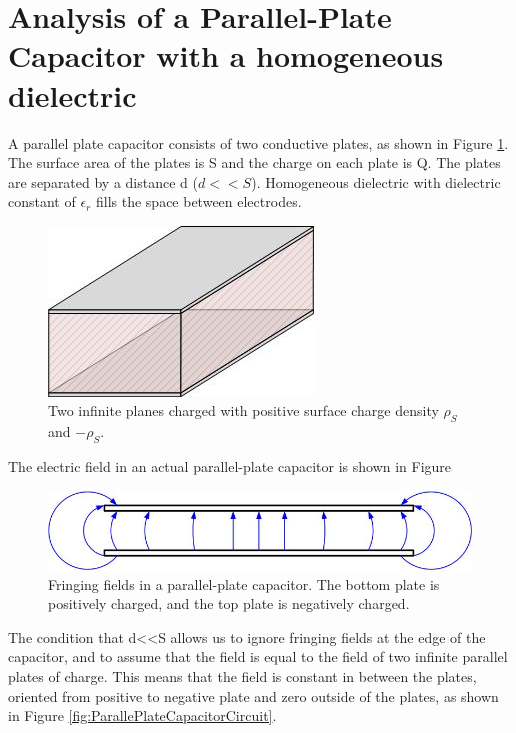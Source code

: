 \documentclass{ximera}
\begin{document}
\section{Analysis of a Parallel-Plate Capacitor with a homogeneous dielectric}


A parallel plate capacitor consists of two conductive plates, as shown in Figure \ref{fig:ParallePlateCapacitorPlain}. The surface area of the plates is S and the charge on each plate is Q. The plates are separated by a distance d ($d<<S$). Homogeneous dielectric with dielectric constant of $\epsilon_r$ fills the space between electrodes.



\begin{figure}[htbp]
\begin{center}
\includegraphics[scale=0.8]{../jpg/ppw.jpg}
\end{center}
\caption{Two infinite planes charged with positive surface charge density $\rho_S$ and $-\rho_S.$}
\label{fig:ParallePlateCapacitorPlain}
\end{figure}

The electric field in an actual parallel-plate capacitor is shown in Figure 

\begin{figure}[htbp]
\begin{center}
\includegraphics[scale=0.6]{../jpg/Fringing_Fields_For_Finite_Capacitor.jpg}
\end{center}
\caption{Fringing fields in a parallel-plate capacitor. The bottom plate is positively charged, and the top plate is negatively charged.}
\label{fig:FiringinFields}
\end{figure}

The condition that d<<S allows us to ignore fringing fields at the edge of the capacitor, and to assume that the field is equal to the field of two infinite parallel plates of charge. This means that the field is constant in between the plates, oriented from positive to negative plate and zero outside of the plates, as shown in Figure \ref{fig:ParallePlateCapacitorCircuit}.  
\end{document}
